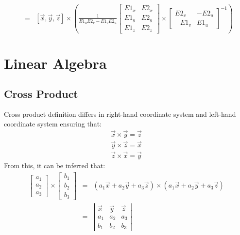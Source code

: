 \documentclass[12pt]{article}
\begin{document}
\begin{eqnarray*}
            & = &
            \left[ \overrightarrow{x}, \overrightarrow{y}, \overrightarrow{z} \right]       
            \times
            \left(
                \frac{1}{E1_uE2_v-E1_vE2_u}
                \left[ \begin{array}{cc}
                    E1_x & E2_x \\
                    E1_y & E2_y \\
                    E1_z & E2_z
                \end{array} \right]
                \times
                \left[ \begin{array}{cc}
                     E2_v & -E2_u \\
                    -E1_v &  E1_u
                \end{array} \right]^{-1}
            \right)
        \end{eqnarray*}
    
\section{Linear Algebra}
    \subsection{Cross Product}
    Cross product definition differs in right-hand coordinate system and left-hand
    coordinate system ensuring that:
    \[ \begin{array}{c}
        \overrightarrow{x} \times \overrightarrow{y} = \overrightarrow{z} \\
        \overrightarrow{y} \times \overrightarrow{z} = \overrightarrow{x} \\
        \overrightarrow{z} \times \overrightarrow{x} = \overrightarrow{y}
    \end{array} \]
    From this, it can be inferred that:
    \begin{eqnarray*}
        \left[ \begin{array}{c}
            a_1 \\ a_2 \\ a_3
        \end{array} \right]
        \times
        \left[ \begin{array}{c}
            b_1 \\ b_2 \\ b_3
        \end{array} \right] &
        = &
        \left(
            a_1\overrightarrow{x} + a_2\overrightarrow{y} + a_3\overrightarrow{z}
        \right)
        \times
        \left(
            a_1\overrightarrow{x} + a_2\overrightarrow{y} + a_3\overrightarrow{z}
        \right) \\
        & = &
        \left| \begin{array}{ccc}
            \overrightarrow{x} & \overrightarrow{y} & \overrightarrow{z} \\
            a_1 & a_2 & a_3 \\
            b_1 & b_2 & b_3
        \end{array} \right|
    \end{eqnarray*}
\end{document}
